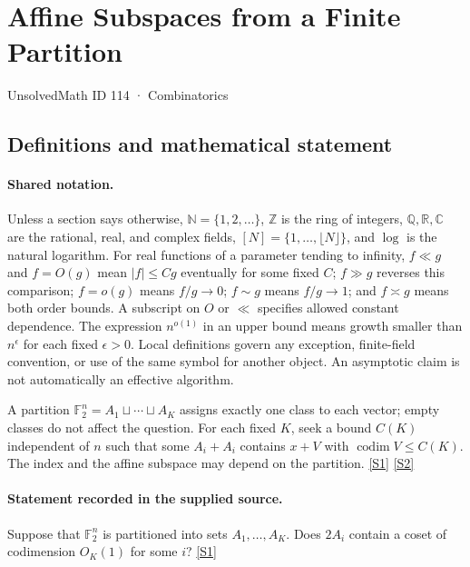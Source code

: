 \documentclass[11pt,a4paper]{article}
\newcommand{\N}{\mathbb{N}}
\newcommand{\Z}{\mathbb{Z}}
\newcommand{\Q}{\mathbb{Q}}
\newcommand{\R}{\mathbb{R}}
\newcommand{\C}{\mathbb{C}}
\newcommand{\F}{\mathbb{F}}
\newcommand{\sref}[2]{\hyperlink{source:#1:#2}{[S#2]}}
\begin{document}

\setcounter{section}{113}

\section{Affine Subspaces from a Finite Partition}\label{114}

{\small\sffamily UnsolvedMath ID 114 · Combinatorics}

\subsection{Definitions and mathematical statement}

\paragraph{Shared notation.}Unless a section says otherwise, $\N=\{1,2,\ldots\}$,
$\Z$ is the ring of integers, $\Q,\R,\C$ are the rational, real, and complex
fields, $[N]=\{1,\ldots,\lfloor N\rfloor\}$, and $\log$ is the natural
logarithm. For real functions of a parameter tending to infinity,
$f\ll g$ and $f=O(g)$ mean $|f|\leq Cg$ eventually for some fixed $C$;
$f\gg g$ reverses this comparison; $f=o(g)$ means $f/g\to0$;
$f\sim g$ means $f/g\to1$; and $f\asymp g$ means both order bounds.
A subscript on $O$ or $\ll$ specifies allowed constant dependence.
The expression $n^{o(1)}$ in an upper bound means growth smaller than
$n^\epsilon$ for each fixed $\epsilon>0$. Local definitions govern any
exception, finite-field convention, or use of the same symbol for another
object. An asymptotic claim is not automatically an effective algorithm.



A partition $\F_2^n=A_1\sqcup\cdots\sqcup A_K$ assigns exactly one class to each vector; empty classes do not affect the question. For each fixed $K$, seek a bound $C(K)$ independent of $n$ such that some $A_i+A_i$ contains $x+V$ with $\operatorname{codim}V\leq C(K)$. The index and the affine subspace may depend on the partition. \sref{114}{1} \sref{114}{2}

\paragraph{Statement recorded in the supplied source.}
Suppose that $\mathbb{F}_2^n$ is partitioned into sets $A_1, \dots, A_K$. Does $2A_i$ contain a coset of codimension $O_K(1)$ for some $i$? \sref{114}{1}
\end{document}
